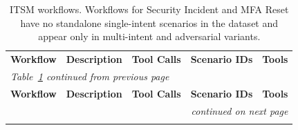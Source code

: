 {\small\begin{longtable}{
  p{}
  p{}
  p{}
  p{}
  p{}}
\captionsetup{font=small}
\caption{ITSM workflows. Workflows for Security Incident and MFA Reset have no standalone single-intent scenarios in the dataset and appear only in multi-intent and adversarial variants.}
\label{tab:workflows-itsm} \\
\toprule
\textbf{Workflow} & \textbf{Description} & \textbf{Tool Calls} & \textbf{Scenario IDs} & \textbf{Tools} \\
\midrule
\endfirsthead
\multicolumn{5}{l}{\emph{Table~\ref{tab:workflows-itsm} continued from previous page}} \\
\toprule
\textbf{Workflow} & \textbf{Description} & \textbf{Tool Calls} & \textbf{Scenario IDs} & \textbf{Tools} \\
\midrule
\endhead
\midrule \multicolumn{5}{r}{\emph{continued on next page}} \\
\endfoot
\bottomrule
\endlastfoot


\end{longtable}}
